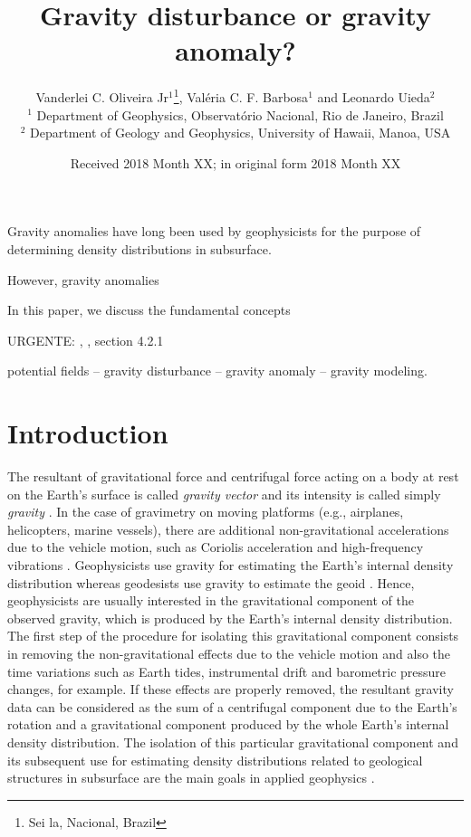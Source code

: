 \documentclass[extra]{gji}
\title[Gravity disturbance or gravity anomaly?]
      {Gravity disturbance or gravity anomaly?}
\author[Oliveira Jr, Barbosa and Uieda]
{Vanderlei C. Oliveira Jr$^1$\thanks{Sei la, Nacional, Brazil}, Val\'{e}ria C. F. Barbosa$^1$ and Leonardo Uieda$^2$ \\
	$^1$ Department of Geophysics, Observat\'{o}rio Nacional, Rio de Janeiro, Brazil \\
	$^2$ Department of Geology and Geophysics, University of Hawaii, Manoa, USA
}
\date{Received 2018 Month XX; in original form 2018 Month XX}
\begin{document}
\label{firstpage}

\maketitle


\begin{summary}
 Gravity anomalies have long been used by geophysicists for the 
 purpose of determining density distributions in subsurface.
 
 However, gravity anomalies 
 
 In this paper, we discuss the fundamental concepts 
 
 URGENTE: \citep{marussi1974}, \citep{torge2012}, section 4.2.1
\end{summary}

\begin{keywords}
 potential fields -- gravity disturbance -- gravity anomaly -- gravity modeling.
\end{keywords}

\section{Introduction}

The resultant of gravitational force and centrifugal force acting 
on a body at rest on the Earth's surface is called 
\textit{gravity vector} and its intensity is called simply 
\textit{gravity} \citep{hofmann-wellenhof-moritz2005}.
In the case of gravimetry on moving platforms (e.g., airplanes,
helicopters, marine vessels), there are additional
non-gravitational accelerations due to the vehicle motion, 
such as Coriolis acceleration and high-frequency vibrations 
\citep{glennie-etal2000,nabighian-etal2005-grav,baumann-etal2012}.
Geophysicists use gravity for estimating the Earth's 
internal density distribution whereas geodesists use
gravity to estimate the geoid \citep{li2001}.
Hence, geophysicists are usually interested 
in the gravitational component of the observed gravity, 
which is produced by the Earth's internal 
density distribution.
%
The first step of the procedure for isolating this 
gravitational component consists in removing the non-gravitational 
effects due to the vehicle motion and also the time variations 
such as Earth tides, instrumental drift and barometric 
pressure changes, for example.
If these effects are properly removed, the resultant 
gravity data can be considered as the sum of a 
centrifugal component due to the Earth's rotation and
a gravitational component produced by the whole Earth's
internal density distribution.
The isolation of this particular gravitational component 
and its subsequent use for estimating density 
distributions related to geological structures in subsurface 
are the main goals in applied geophysics 
\citep{blakely1996}.
\end{document}
